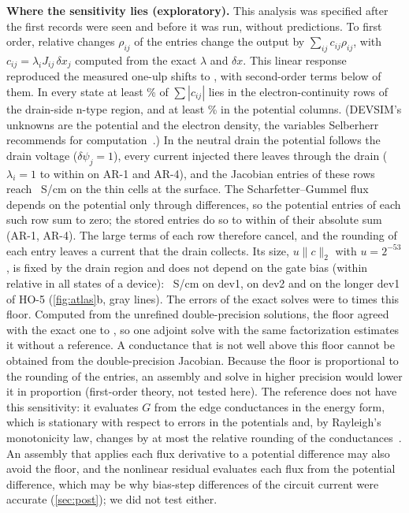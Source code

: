 \documentclass[11pt]{article}
\begin{document}
\textbf{Where the sensitivity lies (exploratory).} This analysis was specified after the first records were seen and
before it was run, without predictions. To first order, relative changes $\rho_{ij}$ of the entries change the output by
$\sum_{ij} c_{ij}\rho_{ij}$, with $c_{ij} = \lambda_i J_{ij}\,\delta x_j$ computed from the exact $\lambda$ and $\delta x$.
This linear response reproduced the measured one-ulp shifts to \xsLinearMax{}, with second-order terms below
\xsSecondMax{} of them. In every state at least \xsDrainMin\% of $\sum|c_{ij}|$ lies in the electron-continuity rows of
the drain-side n-type region, and at least \xsColsPotMin\% in the potential columns. (DEVSIM's unknowns are the
potential and the electron density, the variables Selberherr recommends for computation~\cite[Sec.~5.2]{Selberherr1984}.)
In the neutral drain the potential
follows the drain voltage ($\delta\psi_j = 1$), every current injected there leaves through the drain ($\lambda_i = 1$ to
within \xfLamDev{} on AR-1 and AR-4), and the Jacobian entries of these rows reach \xsEntryMax{}~S/cm on the thin cells
at the surface. The Scharfetter--Gummel flux depends on the potential only through differences, so the potential entries
of each such row sum to zero; the stored entries do so to within \xfRowSumMax{} of their absolute sum (AR-1, AR-4). The large terms of each row
therefore cancel, and the rounding of each entry leaves a current that the drain collects. Its size, $u\|c\|_2$ with
$u = 2^{-53}$, is fixed by the drain region and does not depend on the gate bias (within \xsFloorSpread{} relative in all states of a
device): \xsFloorOne{}~S/cm on dev1,
\xsFloorTwo{} on dev2 and \xsFloorThree{} on the longer dev1 of HO-5 (\cref{fig:atlas}b, gray lines). The errors of the
exact solves were \xsActMin{} to \xsActMax{} times this floor. Computed from the unrefined double-precision solutions,
the floor agreed with the exact one to \xsUnrefMax{}, so one adjoint solve with the same factorization estimates it
without a reference. A conductance that is not well above this floor cannot be obtained from the double-precision
Jacobian. Because the floor is proportional to the rounding of the entries, an assembly and solve in higher precision
would lower it in proportion (first-order theory, not tested here). The reference does not have this sensitivity: it
evaluates $G$ from the edge conductances in the energy form, which is stationary with respect to errors in the
potentials and, by Rayleigh's monotonicity law, changes by at most the relative rounding of the
conductances~\cite{DoyleSnell1984}. An assembly that applies each flux derivative to a potential difference may also
avoid the floor, and the nonlinear residual evaluates each flux from the potential difference, which may be why
bias-step differences of the circuit current were accurate (\cref{sec:post}); we did not test either.
\end{document}
